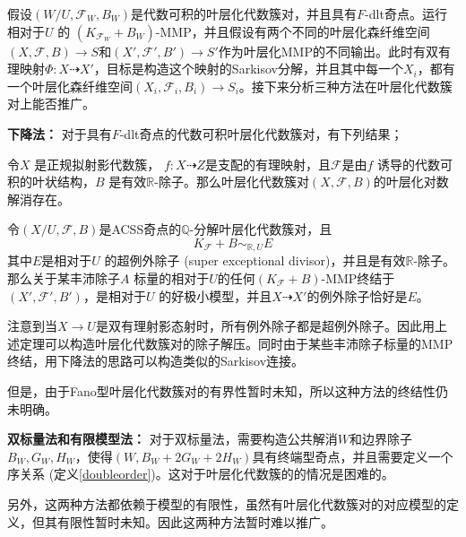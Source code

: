 假设$(W/U,\mathcal{F}_{W},B_{W})$是代数可积的叶层化代数簇对，并且具有$F$-dlt奇点。运行相对于$U$ 的 $(K_{\mathcal{F}_{W}}+B_{W})$-MMP，并且假设有两个不同的叶层化森纤维空间$(X,\mathcal{F},B)\to S$和$(X',\mathcal{F}',B')\to S'$作为叶层化MMP的不同输出。此时有双有理映射$\Phi:X \dashrightarrow X'$，目标是构造这个映射的Sarkisov分解，并且其中每一个$X_{i}$，都有一个叶层化森纤维空间$(X_{i},\mathcal{F}_{i},B_{i})\to S_{i}$。接下来分析三种方法在叶层化代数簇对上能否推广。

\textbf{下降法：}
对于具有$F$-dlt奇点的代数可积叶层化代数簇对，有下列结果；
\begin{lemma}\cite[Lemma 6.2.4]{chlx}
  令$X$ 是正规拟射影代数簇， $f:X \dashrightarrow Z$是支配的有理映射，且$\mathcal{F}$是由$f$ 诱导的代数可积的叶状结构，$B$ 是有效$\mathbb{R}$-除子。那么叶层化代数簇对$(X,\mathcal{F},B)$的叶层化对数解消存在。
\end{lemma}
\begin{theorem}[压缩超例外除子]\cite[Theorem 9.4.1]{chlx}
 令$(X/U,\mathcal{F},B)$是ACSS奇点的$\mathbb{Q}$-分解叶层化代数簇对，且
 \[ K_{\mathcal{F}}+B \sim_{\mathbb{R},U}E \]
其中$E$是相对于$U$ 的超例外除子 (super exceptional divisor)，并且是有效$\mathbb{R}$-除子。那么关于某丰沛除子$A$ 标量的相对于$U$的任何$(K_{\mathcal{F}}+B)$-MMP终结于$(X',\mathcal{F}',B')$，是相对于$U$ 的好极小模型，并且$X \dashrightarrow X' $的例外除子恰好是$E$。 
\end{theorem}
注意到当$X\to U$是双有理射影态射时，所有例外除子都是超例外除子。因此用上述定理可以构造叶层化代数簇对的除子解压。同时由于某些丰沛除子标量的MMP终结，用下降法的思路可以构造类似的Sarkisov连接。

但是，由于Fano型叶层化代数簇对的有界性暂时未知，所以这种方法的终结性仍未明确。

\textbf{双标量法和有限模型法：}
对于双标量法，需要构造公共解消$W$和边界除子$B_{W},G_{W},H_{W}$，使得$(W,B_{W}+2G_{W}+2H_{W})$具有终端型奇点，并且需要定义一个序关系 (定义\ref{doubleorder})。这对于叶层化代数簇的的情况是困难的。

另外，这两种方法都依赖于模型的有限性，虽然有叶层化代数簇对的对应模型的定义，但其有限性暂时未知。因此这两种方法暂时难以推广。
